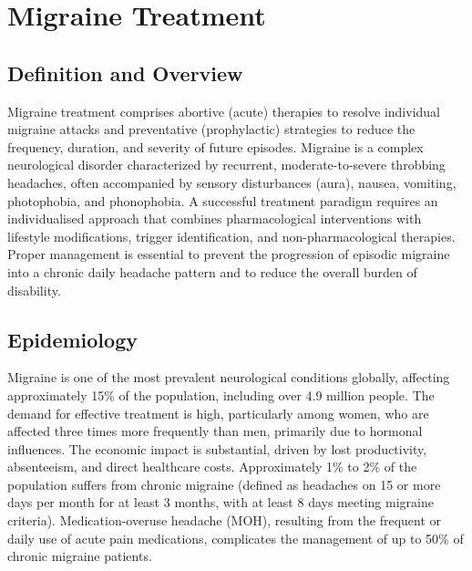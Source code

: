 \chapter{Migraine Treatment}

\section*{Definition and Overview}
Migraine treatment comprises abortive (acute) therapies to resolve individual migraine attacks and preventative (prophylactic) strategies to reduce the frequency, duration, and severity of future episodes. Migraine is a complex neurological disorder characterized by recurrent, moderate-to-severe throbbing headaches, often accompanied by sensory disturbances (aura), nausea, vomiting, photophobia, and phonophobia. A successful treatment paradigm requires an individualised approach that combines pharmacological interventions with lifestyle modifications, trigger identification, and non-pharmacological therapies. Proper management is essential to prevent the progression of episodic migraine into a chronic daily headache pattern and to reduce the overall burden of disability.

\section*{Epidemiology}
Migraine is one of the most prevalent neurological conditions globally, affecting approximately 15\% of the population, including over 4.9 million people. The demand for effective treatment is high, particularly among women, who are affected three times more frequently than men, primarily due to hormonal influences. The economic impact is substantial, driven by lost productivity, absenteeism, and direct healthcare costs. Approximately 1\% to 2\% of the population suffers from chronic migraine (defined as headaches on 15 or more days per month for at least 3 months, with at least 8 days meeting migraine criteria). Medication-overuse headache (MOH), resulting from the frequent or daily use of acute pain medications, complicates the management of up to 50\% of chronic migraine patients.

